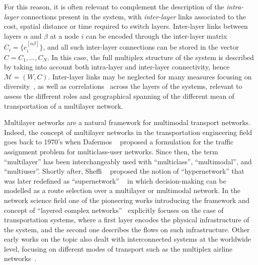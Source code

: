 For this reason, it is often relevant to complement the description of the \textit{intra-layer} connections present in the system, with \textit{inter-layer} links associated to the cost, spatial distance or time required to switch layers. Inter-layer links between layers $\alpha$ and $\beta$ at a node $i$ can be encoded through the inter-layer matrix $C_i=\{c_i^{[\alpha \beta]} \}$, and all such inter-layer connections can be stored in the vector $ C = {C_1, \ldots, C_N}$. In this case, the full multiplex structure of the system is described by taking into account both intra-layer and inter-layer connectivity, hence $\mathcal M = ( W,  C)$. Inter-layer links may be neglected for many measures focusing on diversity~\cite{battiston2014structural}, as well as correlations~\cite{nicosia2015measuring} across the layers of the systems, relevant to assess the different roles and geographical spanning of the different mean of transportation of a multilayer network. 

Multilayer networks are a natural framework for multimodal transport networks. Indeed, the concept of multilayer networks in the transportation engineering field goes back to 1970’s when Dafermos ~\cite{dafermos1972traffic} proposed a formulation for the traffic assignment problem for multiclass-user networks. Since then, the term ``multilayer'' has been interchangeably used with ``multiclass'', ``multimodal'', and ``multiuser''. Shortly after, Sheffi ~\cite{sheffi1978transportation} proposed the notion of ``hypernetwork'' that was later redefined as ``supernetwork'' ~\cite{sheffi1985urban} in which decision-making can be modelled as a route selection over a multilayer or multimodal network. In the network science field one of the pioneering works introducing the framework and concept of ``layered complex networks''~\cite{kurant2006layered} explicitly focuses on the case of transportation systems, where a first layer encodes the physical infrastructure of the system, and the second one describes the flows on such infrastructure. Other early works on the topic also dealt with interconnected systems at the worldwide level, focusing on different modes of transport such as the multiplex airline networks~\cite{cardillo2013emergence}.

